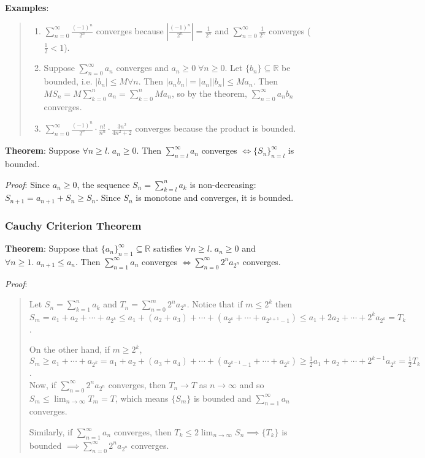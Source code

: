 \documentclass[11pt]{article}
\begin{document}
\textbf{Examples}:
\begin{quote}\vspace{-0.3cm}
	\begin{enumerate}
	\item $\sum_{n=0}^\infty \frac{(-1)^n}{2^n}$ converges because $|\frac{(-1)^n}{2^n}| = \frac{1}{2^n}$ and $\sum_{n=0}^\infty \frac{1}{2^n}$ converges ($\frac{1}{2} < 1$).

	\item Suppose $\sum_{n=0}^\infty a_n$ converges and $a_n \geq 0 \;\forall n \geq 0$. Let $\{b_n\} \subseteq \mathbb{R}$ be bounded, i.e. $|b_n| \leq M \forall n$. Then $|a_nb_n| = |a_n||b_n| \leq Ma_n$. Then $MS_n = M\sum_{k=0}^n a_n = \sum_{k=0}^n M a_n$, so by the theorem, $\sum_{n=0}^\infty a_nb_n$ converges.

	\item $\sum_{n=0}^\infty \frac{(-1)^n}{2^n} \cdot \frac{n!}{n^n} \cdot \frac{3n^2}{4n^2+2}$ converges because the product is bounded.
	\end{enumerate}
\end{quote}

\textbf{Theorem}: Suppose $\forall n \geq l.\; a_n \geq 0$. Then $\sum_{n=l}^\infty a_n$ converges $\iff \{S_n\}_{n=l}^\infty$ is bounded.

\emph{Proof}: Since $a_n \geq 0$, the sequence $S_n = \sum_{k=l}^n a_k$ is non-decreasing: $S_{n+1} = a_{n+1} + S_n \geq S_n$. Since $S_n$ is monotone and converges, it is bounded.

\subsubsection{Cauchy Criterion Theorem}

\textbf{Theorem}: Suppose that $\{a_n\}_{n=1}^\infty \subseteq \mathbb{R}$ satisfies $\forall n \geq l.\; a_n \geq 0$ and $\forall n \geq 1.\; a_{n+1} \leq a_n$. Then $\sum\limits_{n=1}^\infty a_n$ converges $\iff \sum\limits_{n=0}^\infty 2^n a_{2^n}$ converges.

\emph{Proof}:
\begin{quote}\vspace{-0.3cm}
Let $S_n = \sum_{k=1}^n a_k$ and $T_n = \sum_{n=0}^m 2^n a_{2^n}$. Notice that if $m \leq 2^k$ then $S_m = a_1 + a_2 + \cdots + a_{2^k} \leq a_1 + (a_2 + a_3) + \cdots + (a_{2^k} + \cdots + a_{2^{k+1}-1}) \leq a_1 + 2a_2 + \cdots + 2^k a_{2^k} = T_k$.

On the other hand, if $m \geq 2^k$, $S_m \geq a_1 + \cdots + a_{2^k} = a_1 + a_2 + (a_3 + a_4) + \cdots + (a_{2^{k-1}-1} + \cdots + a_{2^k}) \geq \frac{1}{2}a_1 + a_2 + \cdots + 2^{k-1}a_{2^k} = \frac{1}{2}T_k$.\\

Now, if $\sum_{n=0}^\infty 2^n a_{2^n}$ converges, then $T_n \to T$ as $n \to \infty$ and so $S_m \leq \lim_{n \to \infty} T_m = T$, which means $\{S_m\}$ is bounded and $\sum_{n=1}^\infty a_n$ converges.

Similarly, if $\sum_{n=1}^\infty a_n$ converges, then $T_k \leq 2 \lim_{n \to \infty} S_n \implies \{T_k\}$ is bounded $\implies \sum_{n=0}^\infty 2^n a_{2^n}$ converges.
\end{quote}
\end{document}
